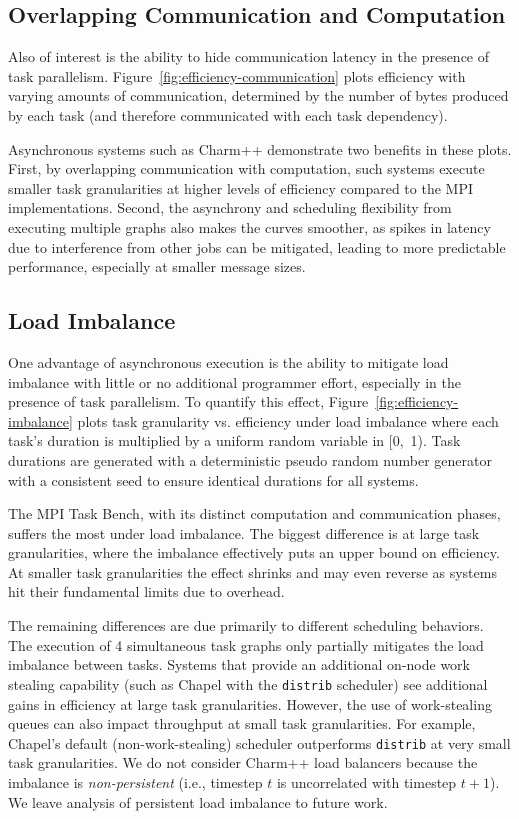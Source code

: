 \subsection{Overlapping Communication and Computation}

Also of interest is the ability to
hide communication latency in the presence of task
parallelism. Figure~\ref{fig:efficiency-communication} plots efficiency with varying amounts of
communication, determined by the number
of bytes produced by each task (and therefore communicated with each
task dependency).

Asynchronous systems such as Charm++ demonstrate two benefits in
these plots. First, by overlapping communication with computation,
such systems execute smaller task granularities at higher
levels of efficiency compared to the MPI
implementations. Second, the asynchrony and scheduling flexibility from
executing multiple graphs also makes the curves smoother,
as spikes in latency due to interference from other jobs can be
mitigated, leading to more predictable performance, especially at
smaller message sizes.

\subsection{Load Imbalance}



One advantage of asynchronous execution is
the ability to mitigate load imbalance with little or no additional programmer effort, especially in the presence of
task parallelism. To quantify this effect,
Figure~\ref{fig:efficiency-imbalance} plots task granularity vs.
efficiency under load imbalance where each task's duration is multiplied by a uniform random variable in [0,~1). Task durations are generated with a deterministic
pseudo random number generator with a consistent seed to ensure
identical durations for all systems.

The MPI Task Bench, with its distinct computation and communication phases,
suffers the most under load imbalance. The biggest
difference is at large task granularities, where the imbalance
effectively puts an upper bound on efficiency. At smaller task
granularities the effect shrinks and may even reverse as systems hit
their fundamental limits due to overhead.

The remaining differences are due primarily to
different scheduling behaviors. The execution of 4
simultaneous task graphs only partially mitigates the
load imbalance between tasks. Systems that provide an
additional on-node work stealing capability (such as Chapel with the \texttt{distrib} scheduler) see additional gains in
efficiency at large task granularities. However, the use of
work-stealing queues can also impact throughput at small task
granularities. For example, Chapel's default (non-work-stealing) scheduler outperforms \texttt{distrib} at very small task granularities. We do not consider Charm++ load balancers because the imbalance is \emph{non-persistent} (i.e., timestep $t$ is uncorrelated with timestep $t+1$). We leave analysis of persistent load imbalance to future work.

